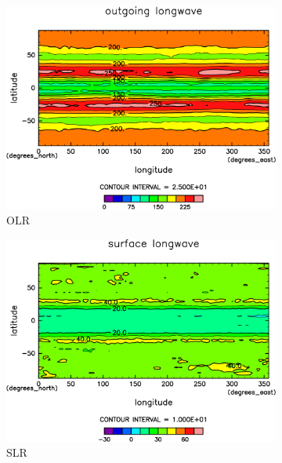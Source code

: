 \documentclass[body]{subfiles}
\begin{document}
\begin{figure}[t]
	\centering
	\begin{subfigure}{.4\textwidth}
		\centering
		\includegraphics[width=\columnwidth]{S1500/OLR,time=3650:4015-crop-rotate.pdf}
		\caption{OLR \hmu*{[W/m^{-2}]}}\label{S1500OLR}
	\end{subfigure}
	\begin{subfigure}{.4\textwidth}
		\centering
		\includegraphics[width=\columnwidth]{S1500/SLR,time=3650:4015-crop-rotate.pdf}
		\caption{SLR\hmu*{[W/m^{-2}]}}\label{S1500SLR}
	\end{subfigure}
	\begin{subfigure}{.4\textwidth}
		\centering

\end{subfigure}
\end{figure}
\end{document}
